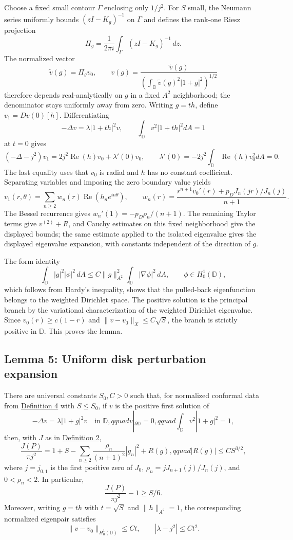 \documentclass[11pt]{article}
\begin{document}
Choose a fixed small contour \(\Gamma\) enclosing only \(1/j^2\). For
\(S\) small, the Neumann series uniformly bounds \((zI-K_g)^{-1}\) on
\(\Gamma\) and defines the rank-one Riesz projection \[
\Pi_g=\frac1{2\pi i}\int_\Gamma(zI-K_g)^{-1}\,dz.
\] The normalized vector \[
\widetilde v(g)=\Pi_gv_0,
\qquad
v(g)=\frac{\widetilde v(g)}{\left(\int_{\mathbb D}\widetilde v(g)^2|1+g|^2\right)^{1/2}}
\] therefore depends real-analytically on \(g\) in a fixed \(A^2\)
neighborhood; the denominator stays uniformly away from zero. Writing
\(g=t h\), define \(v_1=Dv(0)[h]\). Differentiating \[
-\Delta v=\lambda|1+th|^2v,
\qquad \int_{\mathbb D}v^2|1+th|^2dA=1
\] at \(t=0\) gives \[
(-\Delta-j^2)v_1=2j^2\operatorname{Re}(h)v_0+\lambda'(0)v_0,
\qquad
\lambda'(0)=-2j^2\int_{\mathbb D}\operatorname{Re}(h)v_0^2dA=0.
\] The last equality uses that \(v_0\) is radial and \(h\) has no
constant coefficient. Separating variables and imposing the zero
boundary value yields \[
v_1(r,\theta)=\sum_{n\ge2}w_n(r)\operatorname{Re}(h_ne^{in\theta}),
\qquad
w_n(r)=\frac{r^{n+1}v_0'(r)+p_DJ_n(jr)/J_n(j)}{n+1}.
\] The Bessel recurrence gives \(w_n'(1)=-p_D\rho_n/(n+1)\). The
remaining Taylor terms give \(v^{(2)}+R\), and Cauchy estimates on this
fixed neighborhood give the displayed bounds; the same estimate applied
to the isolated eigenvalue gives the displayed eigenvalue expansion,
with constants independent of the direction of \(g\).

The form identity \[
\int_{\mathbb D}|g|^2|\phi|^2\,dA
\le C\|g\|_{A^2}^2\int_{\mathbb D}|\nabla\phi|^2\,dA,
\qquad \phi\in H^1_0(\mathbb D),
\] which follows from Hardy's inequality, shows that the pulled-back
eigenfunction belongs to the weighted Dirichlet space. The positive
solution is the principal branch by the variational characterization of
the weighted Dirichlet eigenvalue. Since \(v_0(r)\ge c(1-r)\) and
\(\|v-v_0\|_X\le C\sqrt S\), the branch is strictly positive in
\(\mathbb D\). This proves the lemma.

\subsection{Lemma 5: Uniform disk perturbation
expansion}\label{lem-disk-perturbation}

There are universal constants \(S_0,C>0\) such that, for normalized
conformal data from \hyperref[def-conformal-data]{Definition 4} with
\(S\le S_0\), if \(v\) is the positive first solution of \[
-\Delta v=\lambda|1+g|^2v\quad\text{in }\mathbb D,qquad v|_{\partial\mathbb D}=0,qquad \int_{\mathbb D}v^2|1+g|^2=1,
\] then, with \(J\) as in \hyperref[def-j-functional]{Definition 2}, \[
\frac{J(P)}{\pi j^2}=1+S-\sum_{n\ge2}\frac{\rho_n}{(n+1)^2}|g_n|^2+R(g),qquad |R(g)|\le CS^{3/2},
\] where \(j=j_{0,1}\) is the first positive zero of \(J_0\),
\(\rho_n=jJ_{n+1}(j)/J_n(j)\), and \(0<\rho_n<2\). In particular, \[
\frac{J(P)}{\pi j^2}-1\ge S/6.
\] Moreover, writing \(g=t h\) with \(t=\sqrt S\) and \(\|h\|_{A^2}=1\),
the corresponding normalized eigenpair satisfies \[
\|v-v_0\|_{H^1_0(\mathbb D)}\le Ct,
\qquad |\lambda-j^2|\le Ct^2.
\]
\end{document}
